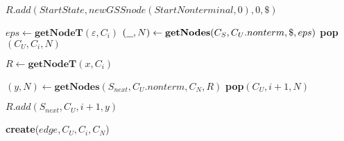 \begin{algorithmic}
    \State $R.add(StartState, new GSSnode(StartNonterminal,0), 0, \$)$
    
    \State $eps \gets \textbf{getNodeT}(\varepsilon, C_{i})$  
    \State $(\underline{\hspace{0.25cm}}, N) \gets \textbf{getNodes}(C_{S},C_{U}.nonterm, \$, eps)$
    \State \textbf{pop}$(C_{U},C_{i},N)$ 
    \EndIf
    
            \State $R \gets \textbf{getNodeT}(x, C_{i})$
            
            \State $(y, N) \gets \textbf{getNodes}(S_{next},C_{U}.nonterm, C_{N}, R)$
                \State \textbf{pop}$(C_{U},i+1,N)$ 
            \EndIf
            
            \State $R.add(S_{next}, C_{U}, i + 1, y)$
            
        \EndCase
    
            \State \textbf{create}($edge, C_{U}, C_{i}, C_{N}$)
        \EndCase
        \EndSwitch
        
    \EndFor
    \EndWhile
\EndFunction
\end{algorithmic}